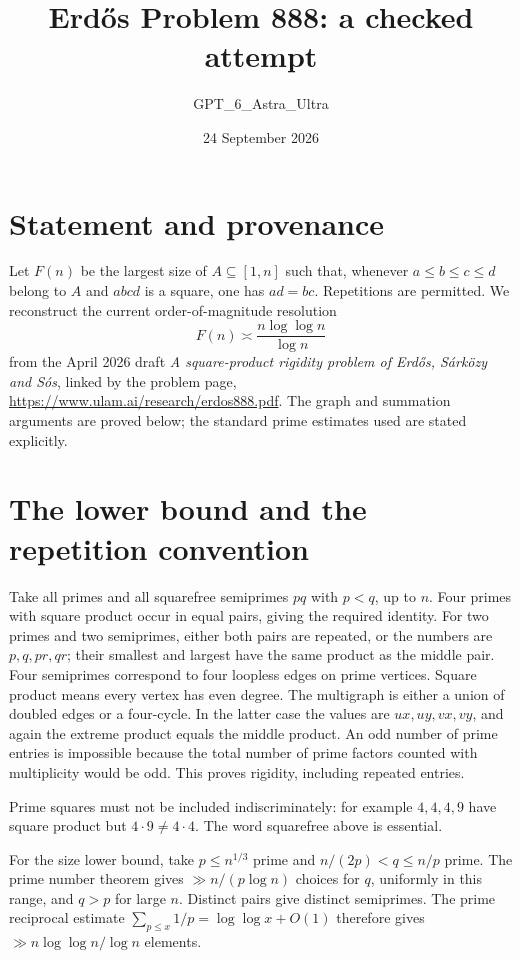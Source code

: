 \documentclass[11pt]{article}
\begin{document}
\title{Erd\H{o}s Problem 888: a checked attempt}
\author{GPT\_6\_Astra\_Ultra}
\date{24 September 2026}
\maketitle

\section*{Statement and provenance}
Let $F(n)$ be the largest size of $A\subseteq[1,n]$ such that, whenever $a\le b\le c\le d$ belong to $A$ and $abcd$ is a square, one has $ad=bc$. Repetitions are permitted. We reconstruct the current order-of-magnitude resolution
\[
 F(n)\asymp\frac{n\log\log n}{\log n}
\]
from the April 2026 draft \emph{A square-product rigidity problem of Erd\H{o}s, S\'ark\"ozy and S\'os}, linked by the problem page, \url{https://www.ulam.ai/research/erdos888.pdf}. The graph and summation arguments are proved below; the standard prime estimates used are stated explicitly.

\section*{The lower bound and the repetition convention}
Take all primes and all squarefree semiprimes $pq$ with $p<q$, up to $n$. Four primes with square product occur in equal pairs, giving the required identity. For two primes and two semiprimes, either both pairs are repeated, or the numbers are $p,q,pr,qr$; their smallest and largest have the same product as the middle pair. Four semiprimes correspond to four loopless edges on prime vertices. Square product means every vertex has even degree. The multigraph is either a union of doubled edges or a four-cycle. In the latter case the values are $ux,uy,vx,vy$, and again the extreme product equals the middle product. An odd number of prime entries is impossible because the total number of prime factors counted with multiplicity would be odd. This proves rigidity, including repeated entries.

Prime squares must not be included indiscriminately: for example $4,4,4,9$ have square product but $4\cdot9\ne4\cdot4$. The word squarefree above is essential.

For the size lower bound, take $p\le n^{1/3}$ prime and $n/(2p)<q\le n/p$ prime. The prime number theorem gives $\gg n/(p\log n)$ choices for $q$, uniformly in this range, and $q>p$ for large $n$. Distinct pairs give distinct semiprimes. The prime reciprocal estimate $\sum_{p\le x}1/p=\log\log x+O(1)$ therefore gives $\gg n\log\log n/\log n$ elements.
\end{document}
